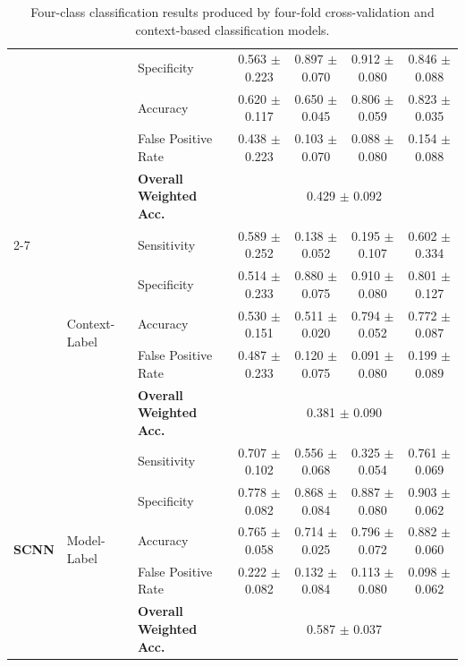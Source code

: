 \begin{table}[ht]
\begin{tabular}{l|llcccc}
  &   & Specificity            & 0.563 $\pm$ 0.223 & 0.897 $\pm$ 0.070 & 0.912 $\pm$ 0.080 & 0.846 $\pm$ 0.088 \\
  &   & Accuracy               & 0.620 $\pm$ 0.117 & 0.650 $\pm$ 0.045 & 0.806 $\pm$ 0.059 & 0.823 $\pm$ 0.035 \\
  &   & False Positive Rate    & 0.438 $\pm$ 0.223 & 0.103 $\pm$ 0.070 & 0.088 $\pm$ 0.080 & 0.154 $\pm$ 0.088 \\
  &   & \textbf{Overall Weighted Acc.}
                                & \multicolumn{4}{c}{0.429 $\pm$ 0.092} \\ \cmidrule{2-7}
  & \multirow{5}{*}{Context-Label}
      & Sensitivity            & 0.589 $\pm$ 0.252 & 0.138 $\pm$ 0.052 & 0.195 $\pm$ 0.107 & 0.602 $\pm$ 0.334 \\
  &   & Specificity            & 0.514 $\pm$ 0.233 & 0.880 $\pm$ 0.075 & 0.910 $\pm$ 0.080 & 0.801 $\pm$ 0.127 \\
  &   & Accuracy               & 0.530 $\pm$ 0.151 & 0.511 $\pm$ 0.020 & 0.794 $\pm$ 0.052 & 0.772 $\pm$ 0.087 \\
  &   & False Positive Rate    & 0.487 $\pm$ 0.233 & 0.120 $\pm$ 0.075 & 0.091 $\pm$ 0.080 & 0.199 $\pm$ 0.089 \\
  &   & \textbf{Overall Weighted Acc.}
                                & \multicolumn{4}{c}{0.381 $\pm$ 0.090} \\ \midrule
\multirow{5}{*}{\textbf{SCNN}}
  & \multirow{5}{*}{Model-Label}
      & Sensitivity            & 0.707 $\pm$ 0.102 & 0.556 $\pm$ 0.068 & 0.325 $\pm$ 0.054 & 0.761 $\pm$ 0.069 \\
  &   & Specificity            & 0.778 $\pm$ 0.082 & 0.868 $\pm$ 0.084 & 0.887 $\pm$ 0.080 & 0.903 $\pm$ 0.062 \\
  &   & Accuracy               & 0.765 $\pm$ 0.058 & 0.714 $\pm$ 0.025 & 0.796 $\pm$ 0.072 & 0.882 $\pm$ 0.060 \\
  &   & False Positive Rate    & 0.222 $\pm$ 0.082 & 0.132 $\pm$ 0.084 & 0.113 $\pm$ 0.080 & 0.098 $\pm$ 0.062 \\
  &   & \textbf{Overall Weighted Acc.}
                                & \multicolumn{4}{c}{0.587 $\pm$ 0.037} \\
    \bottomrule
  \end{tabular}
  \caption{Four-class classification results produced by four-fold cross-validation and context-based classification models.}
  \label{tab:quad_results_full_context}
\end{table}


